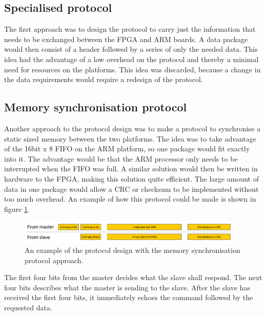 \subsection{Specialised protocol}
The first approach was to design the protocol to carry just the information that needs to be exchanged between the FPGA and ARM boards. A data package would then consist of a header followed by a series of only the needed data. This idea had the advantage of a low overhead on the protocol and thereby a minimal need for resources on the platforms. This idea was discarded, because a change in the data requirements would require a redesign of the protocol.

\subsection{Memory synchronisation protocol}
Another approach to the protocol design was to make a protocol to synchronise a static sized memory between the two platforms. The idea was to take advantage of the 16bit x 8 FIFO on the ARM platform, so one package would fit exactly into it. The advantage would be that the ARM processor only needs to be interrupted when the FIFO was full. A similar solution would then be written in hardware to the FPGA, making this solution quite efficient. The large amount of data in one package would allow a CRC or checksum to be implemented without too much overhead. An example of how this protocol could be made is shown in figure \ref{fig:spi_protocol_format_memsync}.

\begin{figure}[htb]
	\centering
	\includegraphics[width=0.96\textwidth,trim=0 0 0 0]{graphics/spi_protocol_format_memsync.pdf} %
	\caption{An example of the protocol design with the memory synchronisation protocol approach.}
	\label{fig:spi_protocol_format_memsync}			%
\end{figure}

The first four bits from the master decides what the slave shall respond. The next four bits describes what the master is sending to the slave. After the slave has received the first four bits, it immediately echoes the command followed by the requested data.

